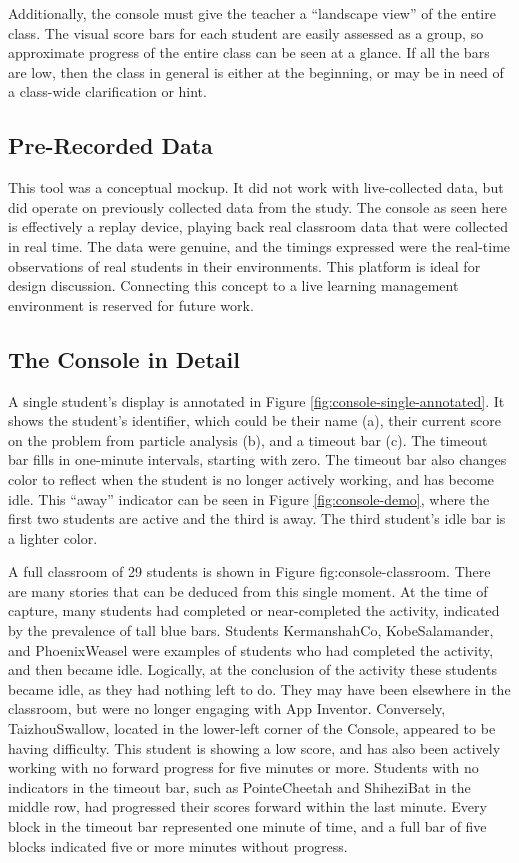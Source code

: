 Additionally, the console must give the teacher a ``landscape view'' of the entire class. The visual score bars for each student are easily assessed as a group, so approximate progress of the entire class can be seen at a glance. If all the bars are low, then the class in general is either at the beginning, or may be in need of a class-wide clarification or hint. 

\subsection{Pre-Recorded Data}
This tool was a conceptual mockup. It did not work with live-collected data, but did operate on previously collected data from the study. The console as seen here is effectively a replay device, playing back real classroom data that were collected in real time. The data were genuine, and the timings expressed were the real-time observations of real students in their environments. This platform is ideal for design discussion. Connecting this concept to a live learning management environment is reserved for future work. 

\subsection{The Console in Detail}
A single student's display is annotated in Figure \ref{fig:console-single-annotated}. It shows the student's identifier, which could be their name (a), their current score on the problem from particle analysis (b), and a timeout bar (c). The timeout bar fills in one-minute intervals, starting with zero. The timeout bar also changes color to reflect when the student is no longer actively working, and has become idle. This ``away'' indicator can be seen in Figure \ref{fig:console-demo}, where the first two students are active and the third is away. The third student's idle bar is a lighter color.

A full classroom of 29 students is shown in Figure {fig:console-classroom}. There are many stories that can be deduced from this single moment. At the time of capture, many students had completed or near-completed the activity, indicated by the prevalence of tall blue bars. Students KermanshahCo, KobeSalamander, and PhoenixWeasel were examples of students who had completed the activity, and then became idle. Logically, at the conclusion of the activity these students became idle, as they had nothing left to do. They may have been elsewhere in the classroom, but were no longer engaging with App Inventor. Conversely, TaizhouSwallow, located in the lower-left corner of the Console, appeared to be having difficulty. This student is showing a low score, and has also been actively working with no forward progress for five minutes or more. Students with no indicators in the timeout bar, such as PointeCheetah and ShiheziBat in the middle row, had progressed their scores forward within the last minute. Every block in the timeout bar represented one minute of time, and a full bar of five blocks indicated five or more minutes without progress. 

